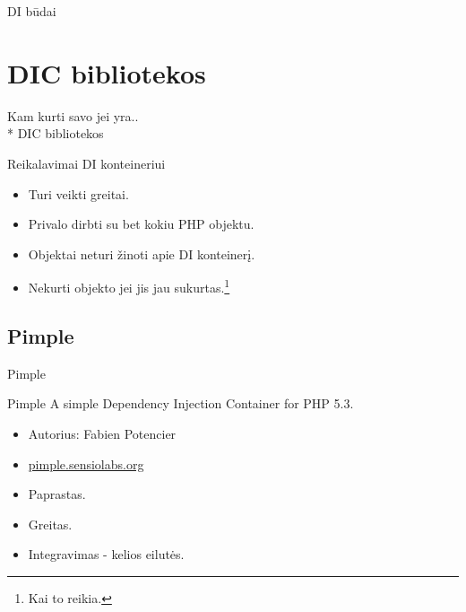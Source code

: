 \documentclass[12pt,a4paper]{beamer}
\begin{document}
\begin{frame}[fragile]{DI būdai}
\end{frame}

\section{DIC bibliotekos}
\begin{frame}
	\begin{center}
        {\footnotesize Kam kurti savo jei yra..}\\*
        \vskip0.5cm
        {\Huge DIC bibliotekos}
	\end{center}
\end{frame}

\begin{frame}{Reikalavimai DI konteineriui}
    \begin{itemize}
        \item Turi veikti greitai.
        \item Privalo dirbti su bet kokiu PHP objektu.
        \item Objektai neturi žinoti apie DI konteinerį.
        \item Nekurti objekto jei jis jau sukurtas.\footnote{Kai to reikia.}
    \end{itemize}
\end{frame}

\subsection{Pimple}
\begin{frame}
	\begin{center}
        {\Huge Pimple}
	\end{center}
\end{frame}

\begin{frame}{Pimple}
    A simple Dependency Injection Container for PHP 5.3.
    \begin{itemize}
        \item Autorius: Fabien Potencier
        \item \url{pimple.sensiolabs.org}
        \item Paprastas.
        \item Greitas.
        \item Integravimas - kelios eilutės.
    \end{itemize}
\end{frame}
\end{document}
